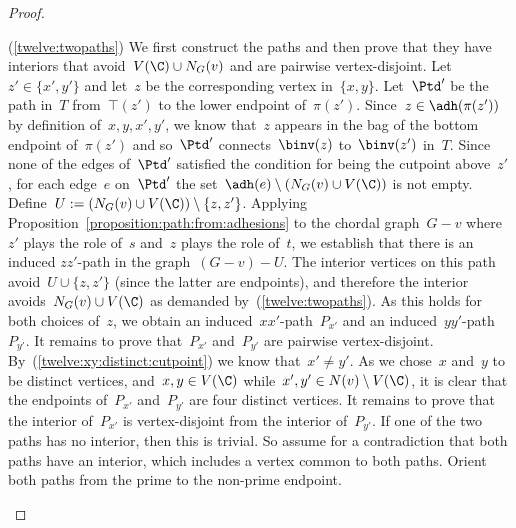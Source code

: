 \begin{proof}
\begin{claimproof}
(\ref{twelve:twopaths}) We first construct the paths and then prove that they have interiors that avoid~$V(\C) \cup N_G(v)$ and are pairwise vertex-disjoint. Let~$z' \in \{x',y'\}$ and let~$z$ be the corresponding vertex in~$\{x,y\}$. Let~$\Ptd'$ be the path in~$T$ from~$\top(z')$ to the lower endpoint of~$\pi(z')$. Since~$z \in \adh(\pi(z'))$ by definition of~$x,y,x',y'$, we know that~$z$ appears in the bag of the bottom endpoint of~$\pi(z')$ and so~$\Ptd'$ connects~$\binv(z)$ to~$\binv(z')$ in~$T$. Since none of the edges of~$\Ptd'$ satisfied the condition for being the cutpoint above~$z'$, for each edge~$e$ on~$\Ptd'$ the set~$\adh(e) \setminus (N_G(v) \cup V(\C))$ is not empty. Define~$U := (N_G(v) \cup V(\C)) \setminus \{z,z'\}$. Applying Proposition~\ref{proposition:path:from:adhesions} to the chordal graph~$G-v$ where~$z'$ plays the role of~$s$ and~$z$ plays the role of~$t$, we establish that there is an induced $zz'$-path in the graph~$(G-v)-U$. The interior vertices on this path avoid~$U \cup \{z,z'\}$ (since the latter are endpoints), and therefore the interior avoids~$N_G(v) \cup V(\C)$ as demanded by~(\ref{twelve:twopaths}). As this holds for both choices of~$z$, we obtain an induced~$xx'$-path~$P_{x'}$ and an induced~$yy'$-path~$P_{y'}$. It remains to prove that~$P_{x'}$ and~$P_{y'}$ are pairwise vertex-disjoint. By~(\ref{twelve:xy:distinct:cutpoint}) we know that~$x' \neq y'$. As we chose~$x$ and~$y$ to be distinct vertices, and~$x,y \in V(\C)$ while~$x',y' \in N(v) \setminus V(\C)$, it is clear that the endpoints of~$P_{x'}$ and~$P_{y'}$ are four distinct vertices. It remains to prove that the interior of~$P_{x'}$ is vertex-disjoint from the interior of~$P_{y'}$. If one of the two paths has no interior, then this is trivial. So assume for a contradiction that both paths have an interior, which includes a vertex common to both paths. Orient both paths from the prime to the non-prime endpoint.


\end{claimproof}
\end{proof}

